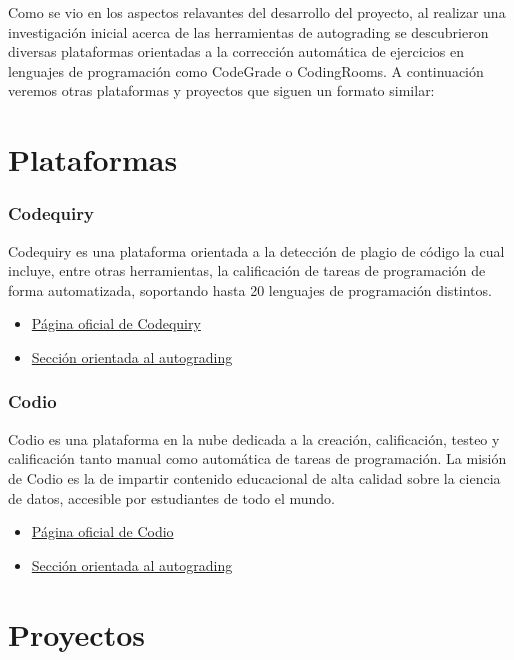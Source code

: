 
Como se vio en los aspectos relavantes del desarrollo del proyecto, al realizar una investigación inicial acerca de las herramientas de autograding se descubrieron diversas plataformas orientadas a la corrección automática de ejercicios en lenguajes de programación como CodeGrade o CodingRooms. A continuación veremos otras plataformas y proyectos que siguen un formato similar:

\section{Plataformas}

\subsubsection{Codequiry}
Codequiry\cite{tool:Codequiry}\cite{tool:CodequiryAutograding} es una plataforma orientada a la detección de plagio de código la cual incluye, entre otras herramientas, la calificación de tareas de programación de forma automatizada, soportando hasta 20 lenguajes de programación distintos.
\begin{itemize}
\item \href{https://codequiry.com/}{Página oficial de Codequiry}
\item \href{https://codequiry.com/auto-grading-programming}{Sección orientada al autograding} 
\end{itemize}

\subsubsection{Codio}
Codio\cite{tool:Codio}\cite{tool:CodioAutograding} es una plataforma en la nube dedicada a la creación, calificación, testeo y calificación tanto manual como automática de tareas de programación.
La misión de Codio es la de impartir contenido educacional de alta calidad sobre la ciencia de datos, accesible por estudiantes de todo el mundo.
\begin{itemize}
\item \href{https://www.codio.com/}{Página oficial de Codio}
\item \href{https://www.codio.com/features/auto-grading}{Sección orientada al autograding}
\end{itemize}

\section{Proyectos}

